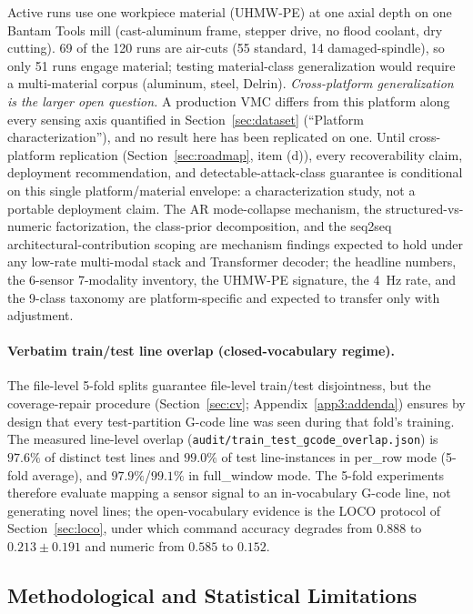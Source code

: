 \documentclass[sensors,article,submit,moreauthors,pdftex]{Definitions/mdpi}
\begin{document}
Active runs use one workpiece material (UHMW-PE) at one axial depth on one Bantam Tools mill (cast-aluminum frame, stepper drive, no flood coolant, dry cutting). 69 of the 120 runs are air-cuts (55 standard, 14 damaged-spindle), so only 51 runs engage material; testing material-class generalization would require a multi-material corpus (aluminum, steel, Delrin). \emph{Cross-platform generalization is the larger open question.} A production VMC differs from this platform along every sensing axis quantified in Section~\ref{sec:dataset} (``Platform characterization''), and no result here has been replicated on one. Until cross-platform replication (Section~\ref{sec:roadmap}, item (d)), every recoverability claim, deployment recommendation, and detectable-attack-class guarantee is conditional on this single platform/material envelope: a characterization study, not a portable deployment claim. The AR mode-collapse mechanism, the structured-vs-numeric factorization, the class-prior decomposition, and the seq2seq architectural-contribution scoping are mechanism findings expected to hold under any low-rate multi-modal stack and Transformer decoder; the headline numbers, the 6-sensor 7-modality inventory, the UHMW-PE signature, the 4~Hz rate, and the 9-class taxonomy are platform-specific and expected to transfer only with adjustment.

\paragraph{Verbatim train/test line overlap (closed-vocabulary regime).} The file-level 5-fold splits guarantee file-level train/test disjointness, but the coverage-repair procedure (Section~\ref{sec:cv}; Appendix~\ref{app3:addenda}) ensures by design that every test-partition G-code line was seen during that fold's training. The measured line-level overlap (\texttt{audit/train\_test\_gcode\_overlap.json}) is $97.6\%$ of distinct test lines and $99.0\%$ of test line-instances in per\_row mode (5-fold average), and $97.9\%$/$99.1\%$ in full\_window mode. The 5-fold experiments therefore evaluate mapping a sensor signal to an in-vocabulary G-code line, not generating novel lines; the open-vocabulary evidence is the LOCO protocol of Section~\ref{sec:loco}, under which command accuracy degrades from $0.888$ to $0.213 \pm 0.191$ and numeric from $0.585$ to $0.152$.

\subsection{Methodological and Statistical Limitations}
\label{sec:lim-method}
\end{document}
